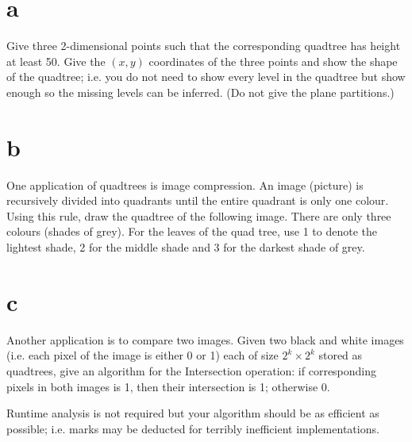 \documentclass[12pt]{article}
\begin{document}
	\begin{itemize}
		\part{a} Give three 2-dimensional points such that the corresponding quadtree has height at least 50.
		Give the $(x,y)$ coordinates of the three points and show the shape of the quadtree; i.e. you do not need to show every level in the quadtree but show enough so the missing levels can be inferred. (Do not give the plane partitions.)
		
		\part{b} One application of quadtrees is image compression.  An image (picture) is recursively
		divided into quadrants until the entire quadrant is only one colour.  Using this rule, draw the quadtree
		of the following image.  There are only three colours (shades of grey). For the leaves of the quad tree,
		use 1 to denote the lightest shade, 2 for the middle shade and 3 for the darkest shade of grey.
		
		
		\part{c} Another application is to compare two images.  Given two black and white images (i.e. each pixel of the image is either 0 or 1)
		each of size $2^k \times 2^k$ stored as quadtrees, give an algorithm for the Intersection operation: if corresponding pixels in both images is 1, then their intersection is 1; otherwise 0.
		
		Runtime analysis is not required but your algorithm should be as efficient as possible; i.e. marks may be deducted for terribly inefficient implementations.
		
	\end{itemize}
	
\end{document}

